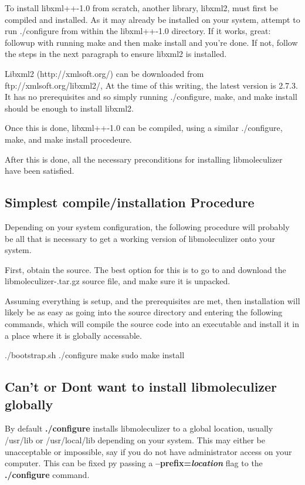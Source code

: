 To install libxml++-1.0 from scratch, another library, libxml2, must
first be compiled and installed.  As it may already be installed on
your system, attempt to run ./configure from within the libxml++-1.0
directory.  If it works, great: followup with running make and then
make install and you're done.  If not, follow the steps in the next
paragraph to ensure libxml2 is installed.

Libxml2 (http://xmlsoft.org/) can be downloaded from
ftp://xmlsoft.org/libxml2/, At the time of this writing, the latest
version is 2.7.3.  It has no prerequisites and so simply running
./configure, make, and make install should be enough to install
libxml2.

Once this is done, libxml++-1.0 can be compiled, using a similar
./configure, make, and make install procedeure.  

After this is done, all the necessary preconditions for installing
libmoleculizer have been satisfied.

\subsection{Simplest compile/installation Procedure}
Depending on your system configuration, the following procedure will
probably be all that is necessary to get a working version of
libmoleculizer onto your system.

First, obtain the source.  The best option for this is to go to
\libmzrwebsite and download the libmoleculizer-\currentversion.tar.gz source
file, and make sure it is unpacked.  

Assuming everything is setup, and the prerequisites are met, then
installation will likely be as easy as going into the source directory
and entering the following commands, which will compile the source
code into an executable and install it in a place where it is
globally accessable.  

\begin{Shell}
./bootstrap.sh
./configure
make
sudo make install
\end{Shell}

\subsection{Can't or Dont want to install libmoleculizer globally}
By default {\bf ./configure} installs libmoleculizer to a global
location, usually /usr/lib or /usr/local/lib depending on your
system.  This may either be unacceptable or impossible, say if you do
not have administrator access on your computer.  This can be fixed py
passing a {\bf --prefix=\emph{location}} flag to the {\bf ./configure}
command.  

